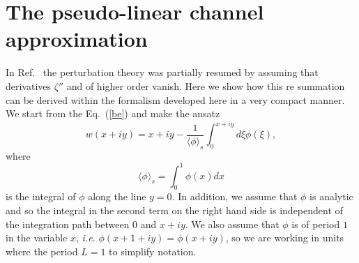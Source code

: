 \documentclass[pre,showpacs,preprintnumbers,amsmath,amssymb,superscriptaddress]{revtex4-1}
\begin{document}
{{\section{The pseudo-linear channel approximation}
\label{Sec4}

In Ref.~\cite{kal2006} the perturbation theory was partially resumed by assuming that derivatives $\zeta''$ and of higher order vanish. Here we show how this re summation can be derived within the formalism developed here in a very compact manner. We start from the Eq.~(\ref{be}) and make the ansatz
\begin{equation}
w(x+iy) = x +iy -\frac{1}{\langle\phi\rangle_s}\int_0^{x+iy} d\xi \phi(\xi),
\end{equation}
where 
\begin{equation}
\langle\phi\rangle_s = \int_0^1 \phi(x) dx
\end{equation}
is the integral of $\phi$ along the line $y=0$. In addition, we assume that $\phi$ is analytic and so the integral in the second term on the right hand side is independent of the integration path between $0$ and $x+iy$. We also assume that $\phi$ is of period $1$ in the variable $x$, {\em i.e.} $\phi(x+1+iy) = \phi(x+iy)$, so we are working in units where the period $L=1$ to simplify notation.

}}
\end{document}
